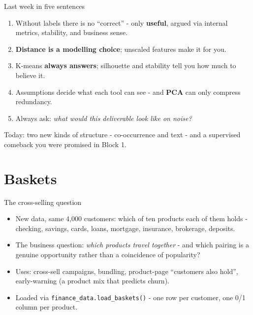 \documentclass[10pt,aspectratio=169]{beamer}
\begin{document}
\begin{frame}{Last week in five sentences}
  \begin{enumerate}
    \item Without labels there is no ``correct'' - only \textbf{useful},
          argued via internal metrics, stability, and business sense.
    \item \textbf{Distance is a modelling choice}; unscaled features make
          it for you.
    \item K-means \textbf{always answers}; silhouette and stability tell you
          how much to believe it.
    \item Assumptions decide what each tool can see - and \textbf{PCA}
          can only compress redundancy.
    \item Always ask: \emph{what would this deliverable look like on
          noise?}
  \end{enumerate}
  \vspace{0.5em}
  \begin{center}
    Today: two new kinds of structure - \alert{co-occurrence} and
    \alert{text} - and a supervised comeback you were promised in Block 1.
  \end{center}
\end{frame}

\section{Baskets}

\begin{frame}{The cross-selling question}
  \begin{itemize}
    \item New data, same 4{,}000 customers: which of ten \alert{products}
          each of them holds - checking, savings, cards, loans, mortgage,
          insurance, brokerage, deposits.
    \item The business question: \emph{which products travel together} -
          and which pairing is a genuine opportunity rather than a
          coincidence of popularity?
    \item Uses: cross-sell campaigns, bundling, product-page ``customers
          also hold'', early-warning (a product mix that predicts churn).
    \item Loaded via \texttt{finance\_data.load\_baskets()} - one row per
          customer, one 0/1 column per product.
  \end{itemize}
\end{frame}
\end{document}
